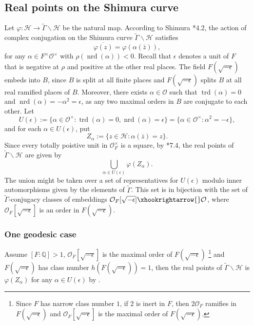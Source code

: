 \documentclass{amsart}
\numberwithin{equation}{subsection}
\numberwithin{theorem}{section}
\theoremstyle{definition}
\theoremstyle{remark}
\newcommand{\bQ}{\mathbb{Q}}
\newcommand{\cH}{\mathcal{H}}
\newcommand{\cO}{\mathcal{O}}
\DeclareMathOperator{\trd}{trd}
\DeclareMathOperator{\nrd}{nrd}
\begin{document}
\subsection{Real points on the Shimura curve} \label{sec:Shimura}
Let $\varphi: \mathcal{H}\to \widetilde{\Gamma} \backslash \mathcal{H}$ be the natural map.
According to Shimura \cite{MR572971}*{4.2}, the action of complex conjugation on the Shimura curve $\widetilde{\Gamma} \backslash \mathcal{H}$ satisfies \[\overline{\varphi(z)} = \varphi(\alpha(\bar{z})),\] 
for any $\alpha\in F^\times\cO^\times$ with $\rho(\nrd(\alpha)) <0$. 
Recall that $\epsilon$ denotes a unit of $F$ that is negative at $\rho$ and positive at the other real places. The field $F(\sqrt{-\epsilon})$ embeds into $B$, since $B$ is split at all finite places and $F(\sqrt{-\epsilon})$ splits $B$ at all real ramified places of $B$. 
Moreover, there exists $\alpha\in \cO$ such that $\trd(\alpha) = 0$ and $\nrd(\alpha) = -\alpha^2 = \epsilon$, as any two maximal orders in $B$ are conjugate to each other. 
Let \[U(\epsilon) := \{ \alpha \in \mathcal{O}^\times :\trd(\alpha) = 0, \nrd(\alpha) = \epsilon\} = \{ \alpha \in \mathcal{O}^\times : \alpha^2 = -\epsilon\},\] and for each $\alpha \in U(\epsilon)$, put \[Z_{\alpha} := \{z\in \mathcal{H}: \alpha(\overline{z}) = z\}.\] Since every totally poistive unit in $\cO_F^\times$ is a square, by \cite{MR572971}*{7.4}, 
the real points of $\widetilde{\Gamma}\backslash\cH$ are given by \[\bigcup_{\alpha\in U(\epsilon)}\varphi(Z_{\alpha}).\]
The union might be taken over a set of representatives for $U(\epsilon)$ modulo inner automorphisms given by the elements of $\widetilde{\Gamma}$. 
This set is in bijection with the set of $\widetilde{\Gamma}$-conjugacy classes of 
embeddings $\mathcal{O}_F[\sqrt{-\epsilon}]\xhookrightarrow{}\mathcal{O}$, where $\mathcal{O}_F[\sqrt{-\epsilon}]$ is an order in $F(\sqrt{-\epsilon})$.



\subsubsection{One geodesic case}
Assume $[F:\bQ]>1$, $\mathcal{O}_F[\sqrt{-\epsilon}]$ is the maximal order of $F(\sqrt{-\epsilon})$ \footnote{Since $F$ has narrow class number $1$, if $2$ is inert in $F$, then $2\cO_F$ ramifies in $F(\sqrt{-\epsilon})$ and $\mathcal{O}_F[\sqrt{-\epsilon}]$ is the maximal order of $F(\sqrt{-\epsilon})$.} and $F(\sqrt{-\epsilon})$ has class number $h(F(\sqrt{-\epsilon})) = 1$, then the real points of $\widetilde{\Gamma}\backslash\cH$ is $\varphi(Z_{\alpha})$ for any $\alpha\in U(\epsilon)$ by . 
\end{document}
